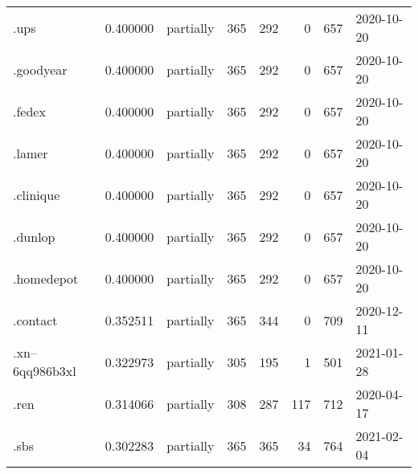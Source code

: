 \begin{tabular}{lrlrrrrl}
.ups                      &          0.400000 &       partially &                         365 &                         292 &                           0 &                 657 &           2020-10-20 \\
.goodyear                 &          0.400000 &       partially &                         365 &                         292 &                           0 &                 657 &           2020-10-20 \\
.fedex                    &          0.400000 &       partially &                         365 &                         292 &                           0 &                 657 &           2020-10-20 \\
.lamer                    &          0.400000 &       partially &                         365 &                         292 &                           0 &                 657 &           2020-10-20 \\
.clinique                 &          0.400000 &       partially &                         365 &                         292 &                           0 &                 657 &           2020-10-20 \\
.dunlop                   &          0.400000 &       partially &                         365 &                         292 &                           0 &                 657 &           2020-10-20 \\
.homedepot                &          0.400000 &       partially &                         365 &                         292 &                           0 &                 657 &           2020-10-20 \\
.contact                  &          0.352511 &       partially &                         365 &                         344 &                           0 &                 709 &           2020-12-11 \\
.xn--6qq986b3xl           &          0.322973 &       partially &                         305 &                         195 &                           1 &                 501 &           2021-01-28 \\
.ren                      &          0.314066 &       partially &                         308 &                         287 &                         117 &                 712 &           2020-04-17 \\
.sbs                      &          0.302283 &       partially &                         365 &                         365 &                          34 &                 764 &           2021-02-04 \\

\end{tabular}
